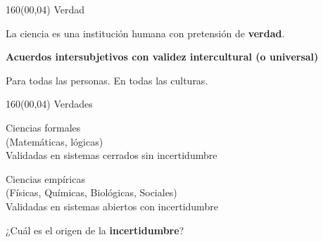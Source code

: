 \documentclass[shownotes,aspectratio=169]{beamer}
\begin{document}
\begin{frame}[plain]
\begin{textblock}{160}(00,04)
\centering
\LARGE Verdad
\end{textblock}
\vspace{2.5cm} \large

\centering

 La ciencia es una institución humana con pretensión de \textbf{verdad}. \\[0.1cm] \pause

\textbf{Acuerdos intersubjetivos con validez intercultural (o universal)}


\vspace{1cm}
\pause


Para todas las personas. En todas las culturas.

\end{frame}


\begin{frame}[plain]
\begin{textblock}{160}(00,04)
\centering
\LARGE Verdades
\end{textblock}
\vspace{1.5cm} \large

\centering

 \Large Ciencias formales \\
 \normalsize \textcolor{black!50}{(Matemáticas, lógicas)} \\
 \large  Validadas en sistemas cerrados sin incertidumbre\\

 \vspace{0.6cm}

  \pause

 \Large Ciencias empíricas \\
\normalsize  \textcolor{black!50}{(Físicas, Químicas, Biológicas, Sociales)} \\
\large Validadas en sistemas abiertos con incertidumbre

\pause
\vspace{1cm}

¿Cuál es el origen de la \textbf{incertidumbre}?

\end{frame}
\end{document}
